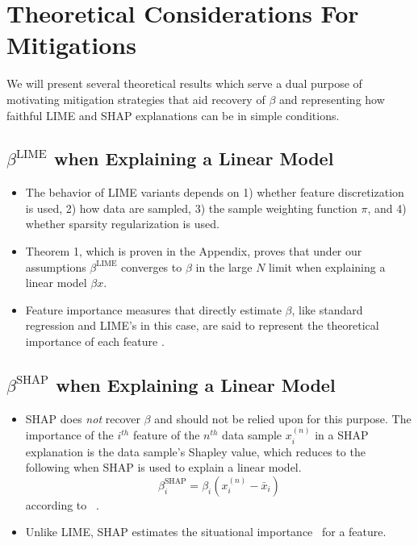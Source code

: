 \documentclass[mnsc,blindrev]{informs3}
\begin{document}
\section{Theoretical Considerations For Mitigations}
    \label{sec:theoretical_considerations}
    We will present several theoretical results which serve a dual purpose of motivating mitigation strategies that aid recovery of $\beta$ and representing how faithful LIME and SHAP explanations can be in simple conditions. 
    
        \subsection{$\beta^\text{LIME}$ when Explaining a Linear Model}
            \label{sec:lime_linear_case}
            \begin{itemize}
             \item The behavior of LIME variants depends on 1) whether feature discretization is used, 2) how data are sampled, 3) the sample weighting function $\pi$, and 4) whether sparsity regularization is used. 
            
             \item Theorem 1, which is proven in the Appendix, proves that under our assumptions $\beta^{\text{LIME}}$ converges to $\beta$ in the large $N$ limit when explaining a linear model $\beta x$.
             
            \item Feature importance measures that directly estimate $\beta$, like standard regression and LIME's in this case, are said to represent the theoretical importance of each feature \citep{AchenChristopherH1982Iaur}. 

            \end{itemize}
            
         \subsection{$\beta^\text{SHAP}$ when Explaining a Linear Model}
            \begin{itemize}
              \item SHAP does \emph{not} recover $\beta$ and should not be relied upon for this purpose. The importance of the $i^{th}$ feature of the $n^{th}$ data sample $x^{(n)}_i$ in a SHAP explanation is the data sample's Shapley value, which reduces to the following when SHAP is used to explain a linear model. 
             \begin{equation}
                \label{eqn:shap_gt}
                \beta_i^\text{SHAP} = \beta_i (x^{(n)}_i - \bar{x}_i)
             \end{equation}
             according to ~\citep{lundberg17shap}.
             
             \item  Unlike LIME, SHAP estimates the situational importance~\citep{StrumbeljErik2014Epma} for a feature. 
             \end{itemize}
\end{document}

